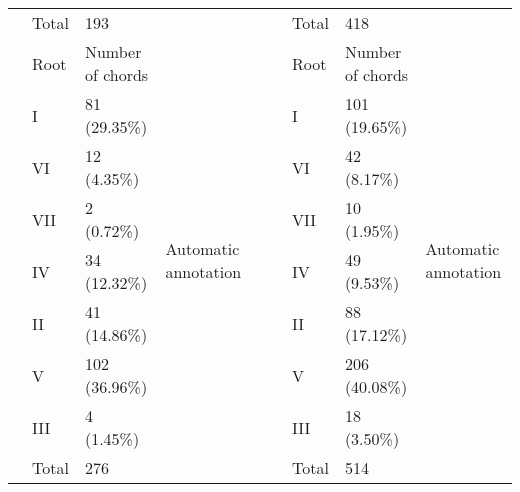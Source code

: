 \begin{table}[]
{\begin{tabular}{|l|l|l|l|l|l|l|l|l|}
 & Total & 193 &  &  &  & Total & 418 &  \\ \cline{2-4} \cline{7-9}
 & Root & Number of chords & \multirow{9}{*}{Automatic annotation} &  &  & Root & Number of chords & \multirow{9}{*}{Automatic annotation} \\ \cline{2-3} \cline{7-8}
 & I & 81 (29.35\%) &  &  &  & I & 101 (19.65\%) &  \\ \cline{2-3} \cline{7-8}
 & VI & 12 (4.35\%) &  &  &  & VI & 42 (8.17\%) &  \\ \cline{2-3} \cline{7-8}
 & VII & 2 (0.72\%) &  &  &  & VII & 10 (1.95\%) &  \\ \cline{2-3} \cline{7-8}
 & IV & 34 (12.32\%) &  &  &  & IV & 49 (9.53\%) &  \\ \cline{2-3} \cline{7-8}
 & II & 41 (14.86\%) &  &  &  & II & 88 (17.12\%) &  \\ \cline{2-3} \cline{7-8}
 & V & 102 (36.96\%) &  &  &  & V & 206 (40.08\%) &  \\ \cline{2-3} \cline{7-8}
 & III & 4 (1.45\%) &  &  &  & III & 18 (3.50\%) &  \\ \cline{2-3} \cline{7-8}
 & Total & 276 &  &  &  & Total & 514 &  \\ \cline{1-4} \cline{6-9}
\end{tabular}
}
\label{table:chord_distribs1}
\end{table}


